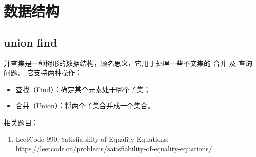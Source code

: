 \chapter{数据结构}

\begin{center}
\end{center}

\section{union find}

并查集是一种树形的数据结构，顾名思义，它用于处理一些不交集的 合并 及 查询 问题。 它支持两种操作： 

\begin{itemize}
    \item 查找（Find）：确定某个元素处于哪个子集；
    \item 合并（Union）：将两个子集合并成一个集合。
\end{itemize}



\ifshowLink
相关题目：
    \begin{enumerate}
        \item LeetCode 990. Satisfiability of Equality Equations: \href{https://leetcode.cn/problems/satisfiability-of-equality-equations/}{https://leetcode.cn/problems/satisfiability-of-equality-equations/}
    \end{enumerate}
\fi